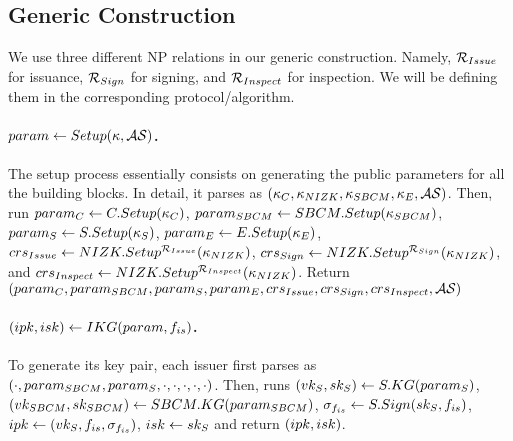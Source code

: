 


\subsection{Generic Construction \CUASGen}
\label{ssec:generic-construction-uas}

We use three different NP relations in our generic construction. Namely,
$\mathcal{R}_{Issue}$ for issuance, $\mathcal{R}_{Sign}$ for signing, and
$\mathcal{R}_{Inspect}$ for inspection. We will be defining them in the
corresponding protocol/algorithm.


\paragraph{$param \gets Setup(\kappa,\mathcal{AS})$.} %
The setup process essentially consists on generating the public parameters
for all the building blocks. In detail, it parses \secpar as $(\kappa_{C},
\kappa_{NIZK},\kappa_{SBCM},\kappa_{E},\mathcal{AS})$. Then, run $param_C \gets
C.Setup(\kappa_{C})$, $param_{SBCM} \gets  SBCM.Setup(\kappa_{SBCM})$, $param_{S} \gets
S.Setup(\kappa_{S})$, $param_{E} \gets E.Setup(\kappa_{E})$, $crs_{Issue} \gets
NIZK.Setup^{\mathcal{R}_{Issue}}(\kappa_{NIZK})$, $crs_{Sign} \gets
NIZK.Setup^{\mathcal{R}_{Sign}}(\kappa_{NIZK})$, and $crs_{Inspect} \gets
NIZK.Setup^{\mathcal{R}_{Inspect}}(\kappa_{NIZK})$. Return $(param_C,param_{SBCM},
param_{S},param_{E},crs_{Issue},crs_{Sign},crs_{Inspect},
\mathcal{AS})$

\paragraph{$(ipk,isk) \gets IKG(param,f_{is})$.} %
To generate its key pair, each issuer first parses \parm as $(\cdot,param_{SBCM},
param_{S},\cdot,\cdot,\cdot,\cdot,\cdot)$. Then, runs $(vk_{S},sk_{S}) \gets
S.KG(param_{S})$, $(vk_{SBCM},sk_{SBCM}) \gets SBCM.KG(param_{SBCM})$,
$\sigma_{f_{is}} \gets S.Sign(sk_{S},f_{is})$, $ipk \gets (vk_{S},f_{is},
\sigma_{f_{is}})$, $isk \gets sk_{S}$ and return $(ipk,isk)$.

